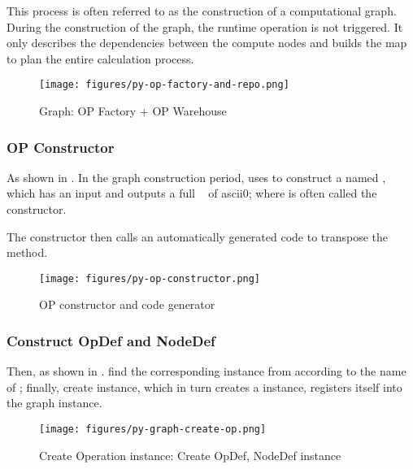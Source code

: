 \begin{content}
This process is often referred to as the construction of a computational graph. During the construction of the graph, the runtime  operation is not triggered. It only describes the dependencies between the compute nodes and builds the  map to plan the entire calculation process.

\begin{figure}[H]
  \centering
  \texttt{[image: figures/py-op-factory-and-repo.png]}
  \caption{Graph: OP Factory + OP Warehouse}
  \label{fig:py-op-factory-and-repo}
\end{figure}


\subsubsection{OP Constructor}
As shown in . In the graph construction period,  uses  to construct a  named , which has an input and outputs a full \  of ascii{0}; where  is often called the  constructor.

The  constructor then calls an automatically generated code to transpose the  method.

\begin{figure}[H]
  \centering
  \texttt{[image: figures/py-op-constructor.png]}
  \caption{OP constructor and code generator}
  \label{fig: py-op-constructor}
\end{figure}


\subsubsection{Construct OpDef and NodeDef}
Then, as shown in .  find the corresponding  instance from  according to the name of ; finally, create  instance, which in turn creates a  instance, registers itself into the graph instance.

\begin{figure}[H]
  \centering
  \texttt{[image: figures/py-graph-create-op.png]}
  \caption{Create Operation instance: Create OpDef, NodeDef instance}
  \label{fig:py-graph-create-op}
\end{figure}

\end{content}


